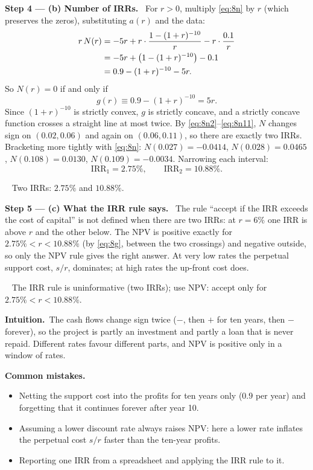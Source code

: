 \documentclass[11pt,a4paper]{article}
\numberwithin{equation}{section}
\newcommand{\step}[2]{\par\medskip\noindent\textbf{Step #1 --- #2.}~}
\newcommand{\intuition}[1]{\par\medskip\noindent\textbf{Intuition.}~#1}
\newcommand{\answer}[1]{\par\smallskip\noindent\fbox{\textbf{Answer #1.}}~}
\newcommand{\pitfalls}{\par\medskip\noindent\textbf{Common mistakes.}}
\begin{document}
\step{4}{(b) Number of IRRs} For $r>0$, multiply \eqref{eq:8n} by $r$ (which preserves the
zeros), substituting $a(r)$ and the data:
\begin{align}
  r\,N(r) &= -5r + r\cdot\frac{1-(1+r)^{-10}}{r} - r\cdot\frac{0.1}{r} \notag\\
          &= -5r + \big(1-(1+r)^{-10}\big) - 0.1 \notag\\
          &= 0.9 - (1+r)^{-10} - 5r. \notag
\end{align}
So $N(r)=0$ if and only if
\begin{equation}\label{eq:8g}
  g(r)\equiv 0.9-(1+r)^{-10} = 5r.
\end{equation}
Since $(1+r)^{-10}$ is strictly convex, $g$ is strictly concave, and a strictly concave function
crosses a straight line at most twice. By \eqref{eq:8n2}--\eqref{eq:8n11}, $N$ changes sign on
$(0.02,0.06)$ and again on $(0.06,0.11)$, so there are exactly two IRRs. Bracketing more
tightly with \eqref{eq:8n}: $N(0.027)=-0.0414$, $N(0.028)=0.0465$, $N(0.108)=0.0130$,
$N(0.109)=-0.0034$. Narrowing each interval:
\begin{equation}\label{eq:8irr}
  \mathrm{IRR}_1 = 2.75\%, \qquad \mathrm{IRR}_2 = 10.88\%.
\end{equation}

\answer{(b)} Two IRRs: $2.75\%$ and $10.88\%$.

\step{5}{(c) What the IRR rule says} The rule ``accept if the IRR exceeds the cost of capital'' is
not defined when there are two IRRs: at $r=6\%$ one IRR is above $r$ and the other below.
The NPV is positive exactly for $2.75\%<r<10.88\%$ (by \eqref{eq:8g}, between the two
crossings) and negative outside, so only the NPV rule gives the right answer. At very low rates
the perpetual support cost, $s/r$, dominates; at high rates the up-front cost does.

\answer{(c)} The IRR rule is uninformative (two IRRs); use NPV: accept only for $2.75\%<r<10.88\%$.

\intuition{The cash flows change sign twice ($-$, then $+$ for ten years, then $-$ forever), so
the project is partly an investment and partly a loan that is never repaid. Different rates
favour different parts, and NPV is positive only in a window of rates.}

\pitfalls
\begin{itemize}
  \item Netting the support cost into the profits for ten years only ($0.9$ per year) and
        forgetting that it continues forever after year 10.
  \item Assuming a lower discount rate always raises NPV: here a lower rate inflates the
        perpetual cost $s/r$ faster than the ten-year profits.
  \item Reporting one IRR from a spreadsheet and applying the IRR rule to it.
\end{itemize}
\end{document}
